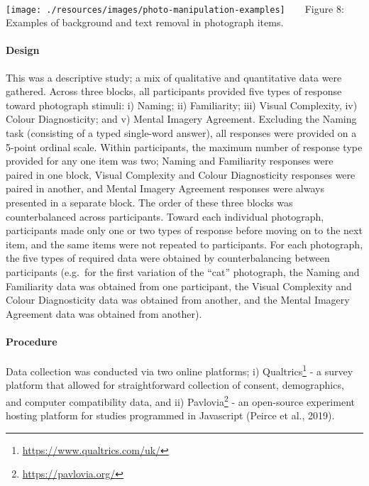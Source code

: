 \documentclass[
  11pt,
]{article}
\begin{document}
~ ~

\texttt{[image: ./resources/images/photo-manipulation-examples]}
~ ~ Figure 8: Examples of background and text removal in photograph
items. ~ ~

\hypertarget{design-1}{%
\paragraph{Design}\label{design-1}}

This was a descriptive study; a mix of qualitative and quantitative data
were gathered. Across three blocks, all participants provided five types
of response toward photograph stimuli: i) Naming; ii) Familiarity; iii)
Visual Complexity, iv) Colour Diagnosticity; and v) Mental Imagery
Agreement. Excluding the Naming task (consisting of a typed single-word
answer), all responses were provided on a 5-point ordinal scale. Within
participants, the maximum number of response type provided for any one
item was two; Naming and Familiarity responses were paired in one block,
Visual Complexity and Colour Diagnosticity responses were paired in
another, and Mental Imagery Agreement responses were always presented in
a separate block. The order of these three blocks was counterbalanced
across participants. Toward each individual photograph, participants
made only one or two types of response before moving on to the next
item, and the same items were not repeated to participants. For each
photograph, the five types of required data were obtained by
counterbalancing between participants (e.g.~for the first variation of
the ``cat'' photograph, the Naming and Familiarity data was obtained
from one participant, the Visual Complexity and Colour Diagnosticity
data was obtained from another, and the Mental Imagery Agreement data
was obtained from another).

\hypertarget{procedure-1}{%
\paragraph{Procedure}\label{procedure-1}}

Data collection was conducted via two online platforms; i)
Qualtrics\footnote{\url{https://www.qualtrics.com/uk/}} - a survey
platform that allowed for straightforward collection of consent,
demographics, and computer compatibility data, and ii)
Pavlovia\footnote{\url{https://pavlovia.org/}} - an open-source
experiment hosting platform for studies programmed in Javascript (Peirce
et al., 2019).
\end{document}
